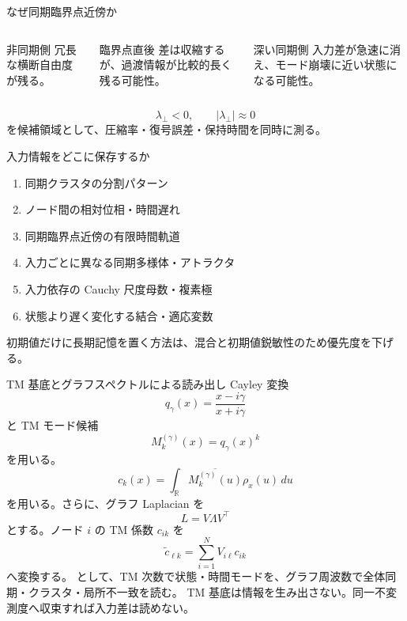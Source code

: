 \documentclass[aspectratio=169,11pt]{beamer}
\newcommand{\lperp}{\lambda_{\perp}}
\begin{document}
\begin{frame}{なぜ同期臨界点近傍か}
  \begin{columns}[T]
    \begin{block}{非同期側}
      冗長な横断自由度が残る。
    \end{block}
    \begin{block}{臨界点直後}
      差は収縮するが、過渡情報が比較的長く残る可能性。
    \end{block}
    \begin{block}{深い同期側}
      入力差が急速に消え、モード崩壊に近い状態になる可能性。
    \end{block}
  \end{columns}
  \vfill
  \[
    \lperp<0,\qquad |\lperp|\approx0
  \]
  を候補領域として、圧縮率・復号誤差・保持時間を同時に測る。
\end{frame}

\begin{frame}{入力情報をどこに保存するか}
  \begin{enumerate}
    \item 同期クラスタの分割パターン
    \item ノード間の相対位相・時間遅れ
    \item 同期臨界点近傍の有限時間軌道
    \item 入力ごとに異なる同期多様体・アトラクタ
    \item 入力依存の Cauchy 尺度母数・複素極
    \item 状態より遅く変化する結合・適応変数
  \end{enumerate}
  \vfill
  初期値だけに長期記憶を置く方法は、混合と初期値鋭敏性のため優先度を下げる。
\end{frame}

\begin{frame}{TM 基底とグラフスペクトルによる読み出し}
  \small
  Cayley 変換
  \[
    q_\gamma(x)=\frac{x-i\gamma}{x+i\gamma}
  \]
  と TM モード候補
  \[
    M_k^{(\gamma)}(x)=q_\gamma(x)^k
  \]
  を用いる。
  \[
    c_k(x)=\int_{\mathbb R}
      \overline{M_k^{(\gamma)}(u)}\rho_x(u)\,du
  \]
  を用いる。さらに、グラフ Laplacian を
  \[
    L=V\Lambda V^\top
  \]
  とする。ノード \(i\) の TM 係数 \(c_{ik}\) を
  \[
    \widetilde c_{\ell k}
    =\sum_{i=1}^{N}V_{i\ell}c_{ik}
  \]
  へ変換する。
  として、TM 次数で状態・時間モードを、グラフ周波数で全体同期・クラスタ・局所不一致を読む。
  \alert{TM 基底は情報を生み出さない。同一不変測度へ収束すれば入力差は読めない。}
\end{frame}
\end{document}
